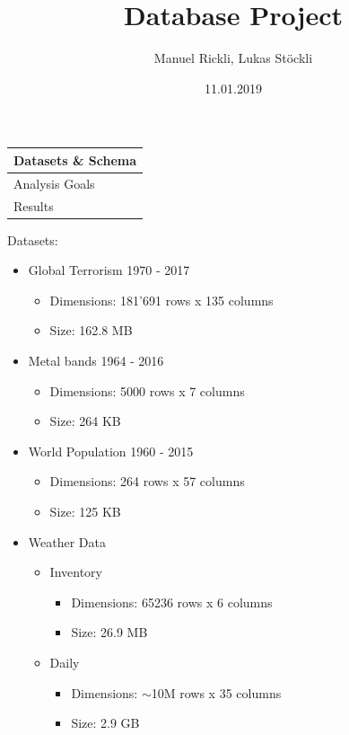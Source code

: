 \documentclass{beamer}
\title              {Database Project}
\author             {Manuel Rickli, Lukas Stöckli}
\institute          {University of Basel}
\date               {11.01.2019}
\begin{document}
\begin{frame}[t,plain]
	\titlepage
\end{frame}


\begin{frame}
	\begin{tabularx}{\textwidth}{X}
		\hline
		\rowcolor{hcolor}
		Datasets \& Schema\\
		\hline
		Analysis Goals\\
		\hline
		Results\\
		\hline
	\end{tabularx}
\end{frame}


\begin{frame}{Datasets:}
	\begin{itemize}
		\item Global Terrorism 1970 - 2017
		\begin{itemize}
			\item Dimensions: 181'691 rows x 135 columns
			\item Size: 162.8 MB
		\end{itemize}
		\item Metal bands 1964 - 2016
		\begin{itemize}
			\item Dimensions: 5000 rows x 7 columns
			\item Size: 264 KB
		\end{itemize}
		\item World Population 1960 - 2015
		\begin{itemize}
			\item Dimensions: 264 rows x 57 columns
			\item Size: 125 KB
		\end{itemize}
		\item Weather Data
		\begin{itemize}
			\item Inventory
			\begin{itemize}
			  \item Dimensions: 65236 rows x 6 columns
			  \item Size: 26.9 MB
		    \end{itemize}
			\item Daily
			\begin{itemize}
			  \item Dimensions: $\sim$10M rows x 35 columns
			  \item Size: 2.9 GB
		    \end{itemize}
		\end{itemize}
	\end{itemize}
\end{frame}
\end{document}
